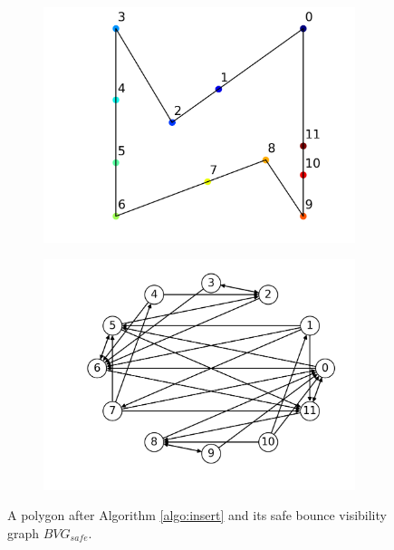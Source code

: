 \documentclass[]{styles/svproc}  %
\begin{document}
\begin{figure}
\centering
\begin{subfigure}{0.5\textwidth}
\centering
\includegraphics[width=\linewidth]{figures/simple_bit_inserted.png}
\end{subfigure}%
\begin{subfigure}{0.5\textwidth}
\centering
\includegraphics[width=\linewidth]{figures/simple_bit_safe_graph.png}
\end{subfigure}
\caption{A polygon after Algorithm \ref{algo:insert} and its safe bounce
visibility graph $BVG_{safe}$. }
\label{fig:simple_bit}
\end{figure}
\end{document}
